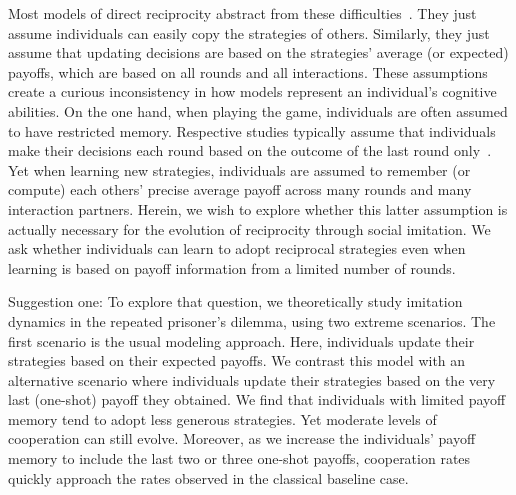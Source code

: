 \documentclass[11pt]{article}
\theoremstyle{plainCl1}
\theoremstyle{plainCl2}
\begin{document}
Most models of direct reciprocity abstract from these difficulties~\citep{brauchli:JTB:1999,brandt:JTB:2006,ohtsuki:JTB:2007b,szolnoki:pre:2009b,imhof2010stochastic,van-segbroeck:prl:2012,grujic:jtb:2012,Martinez2012,stewart:pnas:2013,pinheiro:PLoSCB:2014,stewart:games:2015,Baek2016,hilbe:PNAS:2017,McAvoy:ProcA:2019,glynatsi:SCR:2020,Schmid:PlosCB:2022,Murase:SciRep:2022,Cooney:BMB:2022,Chen:PNASNexus:2023}. 
They just assume individuals can easily copy the strategies of others. 
Similarly, they just assume that updating decisions are based on the strategies' average (or expected) payoffs, which are based on all rounds and all interactions. 
These assumptions create a curious inconsistency in how models represent an individual's cognitive abilities. 
On the one hand, when playing the game, individuals are often assumed to have restricted memory. 
Respective studies typically assume that individuals make their decisions each round based on the outcome of the last round only~\citep[with only a few exceptions, see Refs.][]{Hauert1997,van-veelen:PNAS:2012,Stewart2016,Li:NatCS:2022,Murase:PLoSCompBio:2023a}. 
Yet when learning new strategies, individuals are assumed to remember (or compute) each others' precise average payoff across many rounds and many interaction partners. 
Herein, we wish to explore whether this latter assumption is actually necessary for the evolution of reciprocity through social imitation. 
We ask whether individuals can learn to adopt reciprocal strategies even when learning is based on payoff information from a limited number of rounds. 


Suggestion one:
To explore that question, we theoretically study imitation dynamics in the repeated prisoner's dilemma, using two extreme scenarios. 
The first scenario is the usual modeling approach. 
Here, individuals update their strategies based on their expected payoffs. 
We contrast this model with an alternative scenario where individuals update their strategies based on the very
last (one-shot) payoff they obtained. 
We find that individuals with limited payoff memory tend to adopt less generous strategies. 
Yet moderate levels of cooperation can still evolve. 
Moreover, as we increase the individuals' payoff memory to include the last two or three one-shot payoffs, cooperation rates quickly approach the rates observed in the classical baseline case. 
\end{document}
